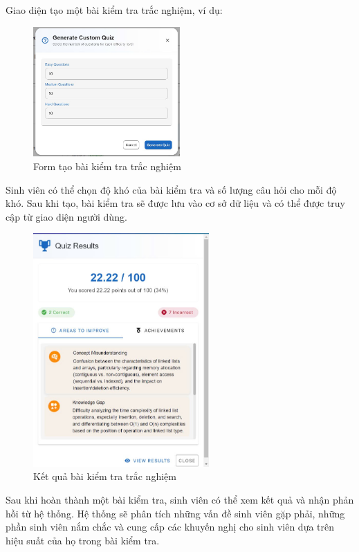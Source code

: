 Giao diện tạo một bài kiểm tra trắc nghiệm, ví dụ:
\begin{figure}[H]
    \centering
    \includegraphics[width=0.5\textwidth]{Images/UI_LLM/Gen_quiz.png}
    \caption{Form tạo bài kiểm tra trắc nghiệm}
\end{figure}

Sinh viên có thể chọn độ khó của bài kiểm tra và số lượng câu hỏi cho mỗi độ khó. Sau khi tạo, bài kiểm tra sẽ được lưu vào cơ sở dữ liệu và có thể được truy cập từ giao diện người dùng.

\begin{figure}[H]
    \centering
    \includegraphics[width=0.6\textwidth]{Images/UI_LLM/Quiz_result.png}
    \caption{Kết quả bài kiểm tra trắc nghiệm}
\end{figure}

Sau khi hoàn thành một bài kiểm tra, sinh viên có thể xem kết quả và nhận phản hồi từ hệ thống. Hệ thống sẽ phân tích những vấn đề sinh viên gặp phải, những phần sinh viên nắm chắc và cung cấp các khuyến nghị cho sinh viên dựa trên hiệu suất của họ trong bài kiểm tra.
